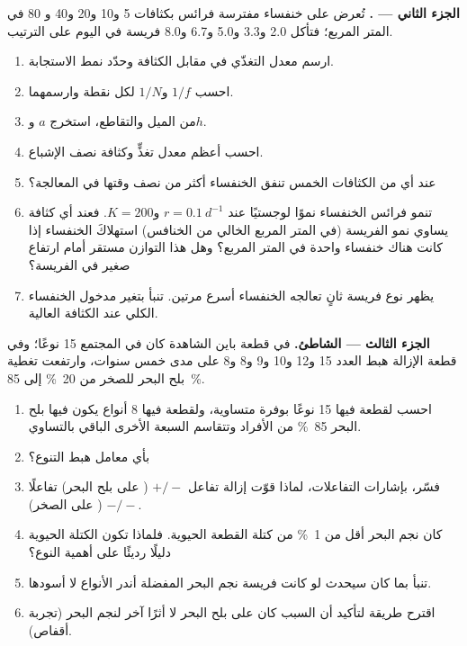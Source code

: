 \begin{problem}
\medskip
\noindent\textbf{الجزء الثاني --- .}
تُعرض على خنفساء مفترسة فرائس بكثافات 5 و10 و20 و40 و
80 في المتر المربع؛ فتأكل 2.0 و3.3 و5.0 و6.7 و8.0 فريسة في اليوم
على الترتيب.
\begin{enumerate}[resume]
  \item ارسم معدل التغذّي في مقابل الكثافة وحدّد نمط
        الاستجابة.
  \item احسب $1/f$ و$1/N$ لكل نقطة وارسمهما.
  \item من الميل والتقاطع، استخرج $a$ و$h$.
  \item احسب أعظم معدل تغذٍّ وكثافة نصف
        الإشباع.
  \item عند أي من الكثافات الخمس تنفق الخنفساء أكثر
        من نصف وقتها في المعالجة؟
  \item تنمو فرائس الخنفساء نموًا لوجستيًا عند $r = \qty{0.1}{d^{-1}}$
        و$K = 200$. فعند أي كثافة يساوي نمو الفريسة (في المتر
        المربع الخالي من الخنافس) استهلاكَ الخنفساء إذا كانت
        هناك خنفساء واحدة في المتر المربع؟ وهل هذا التوازن
        مستقر أمام ارتفاع صغير في الفريسة؟
  \item يظهر نوع فريسة ثانٍ تعالجه الخنفساء أسرع
        مرتين. تنبأ بتغير مدخول الخنفساء الكلي عند الكثافة
        العالية.
\end{enumerate}

\medskip
\noindent\textbf{الجزء الثالث --- الشاطئ.}
في قطعة باين الشاهدة كان في المجتمع 15 نوعًا؛ وفي قطعة
الإزالة هبط العدد 15 و12 و10 و9 و8 و8 على مدى خمس سنوات، وارتفعت
تغطية بلح البحر للصخر من \qty{20}{\%} إلى \qty{85}{\%}.
\begin{enumerate}[resume]
  \item احسب  لقطعة فيها 15 نوعًا بوفرة
        متساوية، ولقطعة فيها 8 أنواع يكون فيها بلح البحر
        \qty{85}{\%} من الأفراد وتتقاسم السبعة الأخرى الباقي
        بالتساوي.
  \item بأي معامل هبط التنوع؟
  \item فسّر، بإشارات التفاعلات، لماذا قوّت إزالة تفاعل
        $+/-$ ( على بلح البحر) تفاعلًا $-/-$
        ( على الصخر).
  \item كان نجم البحر أقل من \qty{1}{\%} من كتلة القطعة الحيوية.
        فلماذا تكون الكتلة الحيوية دليلًا رديئًا على أهمية النوع؟
  \item تنبأ بما كان سيحدث لو كانت فريسة نجم البحر المفضلة
        أندر الأنواع لا أسودها.
  \item اقترح طريقة لتأكيد أن السبب كان  على بلح البحر
        لا أثرًا آخر لنجم البحر (تجربة أقفاص).
\end{enumerate}


\end{problem}
